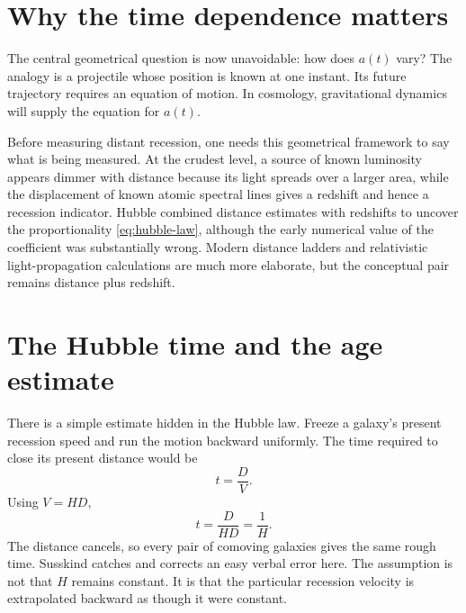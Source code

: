 \section{Why the time dependence matters}

The central geometrical question is now unavoidable: how does \(a(t)\)
vary? The analogy is a projectile whose position is known at one instant.
Its future trajectory requires an equation of motion. In cosmology,
gravitational dynamics will supply the equation for \(a(t)\).

\begin{classroomqa}
\end{classroomqa}

Before measuring distant recession, one needs this geometrical framework to
say what is being measured. At the crudest level, a source of known
luminosity appears dimmer with distance because its light spreads over a
larger area, while the displacement of known atomic spectral lines gives a
redshift and hence a recession indicator. Hubble combined distance
estimates with redshifts to uncover the proportionality
\eqref{eq:hubble-law}, although the early numerical value of the coefficient
was substantially wrong. Modern distance ladders and relativistic
light-propagation calculations are much more elaborate, but the conceptual
pair remains distance plus redshift.

\section{The Hubble time and the age estimate}

There is a simple estimate hidden in the Hubble law. Freeze a galaxy's
present recession speed and run the motion backward uniformly. The time
required to close its present distance would be
\begin{equation}
  t=\frac{D}{V}.
\end{equation}
Using \(V=HD\),
\begin{equation}
  t=\frac{D}{HD}=\frac{1}{H}.
  \label{eq:hubble-time}
\end{equation}
The distance cancels, so every pair of comoving galaxies gives the same
rough time. Susskind catches and corrects an easy verbal error here. The
assumption is not that \(H\) remains constant. It is that the particular
recession velocity is extrapolated backward as though it were constant.

